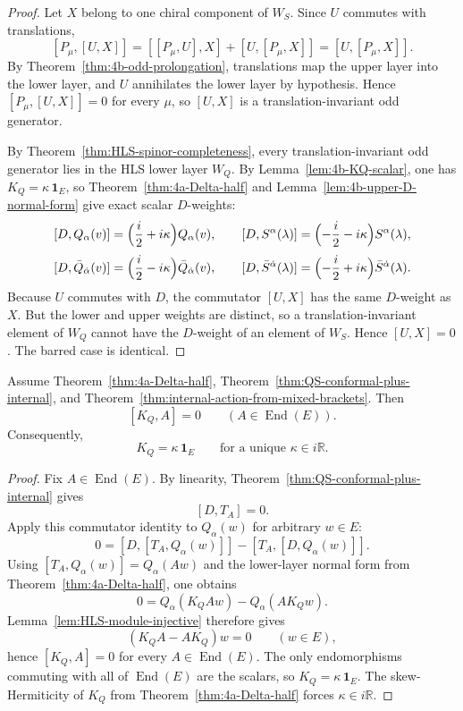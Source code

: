 \begin{proof}
Let \(X\) belong to one chiral component of \(W_S\). Since \(U\) commutes with
translations,
\[
  [P_\mu,[U,X]]
  =
  [[P_\mu,U],X]+[U,[P_\mu,X]]
  =
  [U,[P_\mu,X]].
\]
By Theorem~\ref{thm:4b-odd-prolongation}, translations map the upper layer into
the lower layer, and \(U\) annihilates the lower layer by hypothesis. Hence
\([P_\mu,[U,X]]=0\) for every \(\mu\), so \([U,X]\) is a translation-invariant
odd generator.

By Theorem~\ref{thm:HLS-spinor-completeness}, every translation-invariant odd
generator lies in the HLS lower layer \(W_Q\). By Lemma~\ref{lem:4b-KQ-scalar},
one has \(K_Q=\kappa\,\mathbf 1_E\), so Theorem~\ref{thm:4a-Delta-half} and
Lemma~\ref{lem:4b-upper-D-normal-form} give exact scalar \(D\)-weights:
\[
  [D,Q_\alpha(v)]
  =
  \Bigl(\frac{i}{2}+i\kappa\Bigr)Q_\alpha(v),
  \qquad
  [D,S^\alpha(\lambda)]
  =
  \Bigl(-\frac{i}{2}-i\kappa\Bigr)S^\alpha(\lambda),
\]
\[
  [D,\bar Q_{\dot\alpha}(v)]
  =
  \Bigl(\frac{i}{2}-i\kappa\Bigr)\bar Q_{\dot\alpha}(v),
  \qquad
  [D,\bar S^{\dot\alpha}(\lambda)]
  =
  \Bigl(-\frac{i}{2}+i\kappa\Bigr)\bar S^{\dot\alpha}(\lambda).
\]
Because \(U\) commutes with \(D\), the commutator \([U,X]\) has the same
\(D\)-weight as \(X\). But the lower and upper weights are distinct, so a
translation-invariant element of \(W_Q\) cannot have the \(D\)-weight of an
element of \(W_S\). Hence \([U,X]=0\). The barred case is identical.
\end{proof}

\begin{lemma}
\label{lem:4b-KQ-scalar}
Assume Theorem~\ref{thm:4a-Delta-half},
Theorem~\ref{thm:QS-conformal-plus-internal}, and
Theorem~\ref{thm:internal-action-from-mixed-brackets}. Then
\[
  [K_Q,A]=0
  \qquad
  (A\in\operatorname{End}(E)).
\]
Consequently,
\[
  K_Q=\kappa\,\mathbf 1_E
  \qquad
  \text{for a unique }\kappa\in i\mathbb R.
\]
\end{lemma}

\begin{proof}
Fix \(A\in\operatorname{End}(E)\). By linearity,
Theorem~\ref{thm:QS-conformal-plus-internal} gives
\[
  [D,T_A]=0.
\]
Apply this commutator identity to \(Q_\alpha(w)\) for arbitrary \(w\in E\):
\[
  0
  =
  [D,[T_A,Q_\alpha(w)]]-[T_A,[D,Q_\alpha(w)]].
\]
Using \([T_A,Q_\alpha(w)]=Q_\alpha(Aw)\) and the lower-layer normal form from
Theorem~\ref{thm:4a-Delta-half}, one obtains
\[
  0
  =
  Q_\alpha(K_QAw)-Q_\alpha(AK_Qw).
\]
Lemma~\ref{lem:HLS-module-injective} therefore gives
\[
  (K_QA-AK_Q)w=0
  \qquad
  (w\in E),
\]
hence \([K_Q,A]=0\) for every \(A\in\operatorname{End}(E)\). The only
endomorphisms commuting with all of \(\operatorname{End}(E)\) are the scalars, so
\(K_Q=\kappa\,\mathbf 1_E\). The skew-Hermiticity of \(K_Q\) from
Theorem~\ref{thm:4a-Delta-half} forces \(\kappa\in i\mathbb R\).
\end{proof}

